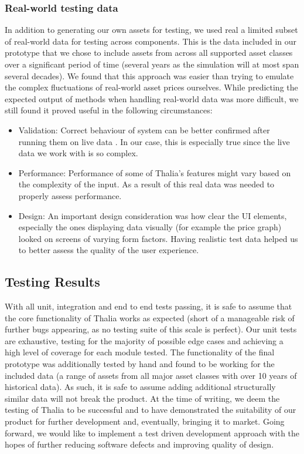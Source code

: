 \documentclass[main.tex]{subfiles}
\begin{document}
\subsubsection{Real-world testing data}

In addition to generating our own assets for testing, we used real a limited subset of real-world data for testing across components. This is the data included in our prototype that we chose to include assets from across all supported asset classes over a significant period of time (several years as the simulation will at most span several decades). We found that this approach was easier than trying to emulate the complex fluctuations of real-world asset prices ourselves. While predicting the expected output of methods when handling real-world data was more difficult, we still found it proved useful in the following circumstances: 

\begin{itemize}

\item Validation:
Correct behaviour of system can be better confirmed after running them on live data \cite{liveData}. In our case, this is especially true since the live data we work with is so complex.

\item Performance:
Performance of some of Thalia's features might vary based on the complexity of the input. As a result of this real data was needed to properly assess performance.

\item Design:
An important design consideration was how clear the UI elements, especially the ones displaying data visually (for example the price graph) looked on screens of varying form factors. Having realistic test data helped us to better assess the quality of the user experience.

\end{itemize}
 

\subsection{Testing Results}

With all unit, integration and end to end tests passing, it is safe to assume that the core functionality of Thalia works as expected (short of a manageable risk of further bugs appearing, as no testing suite of this scale is perfect). Our unit tests are exhaustive, testing for the majority of possible edge cases and achieving a high level of coverage for each module tested. The functionality of the final prototype was additionally tested by hand and found to be working for the included data (a range of assets from all major asset classes with over 10 years of historical data). As such, it is safe to assume adding additional structurally similar data will not break the product.
At the time of writing, we deem the testing of Thalia to be successful and to have demonstrated the suitability of our product for further development and, eventually, bringing it to market. Going forward, we would like to implement a test driven development approach with the hopes of further reducing software defects and  improving quality of design\cite{TDD}.
\end{document}
